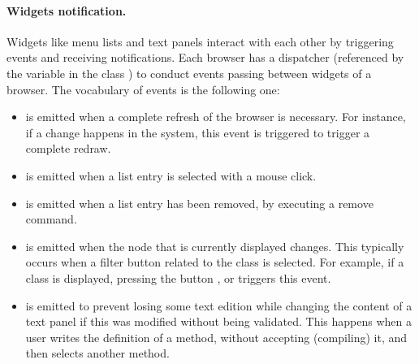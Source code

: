 \documentclass[a4paper,10pt,twoside]{book}
\begin{document}



\paragraph{Widgets notification.} Widgets like menu lists and text panels interact with each other by triggering events and receiving notifications. Each browser has a dispatcher (referenced by the variable  in the class ) to conduct events passing between widgets of a browser. The vocabulary of events is the following one:
\begin{itemize}
\item {} is emitted when a complete refresh of the browser is necessary. For instance, if a change happens in the system, this event is triggered to trigger a complete redraw.

\item {} is emitted when a list entry is selected with a mouse click. 

\item {} is emitted when a list entry has been removed, \eg by executing a remove command. 

\item {} is emitted when the node that is currently displayed changes. This typically occurs when a filter button related to the class is selected. For example, if a class is displayed, pressing the button ,  or  triggers this event.

\item {} is emitted to prevent losing some text edition while changing the content of a text panel if this was modified without being validated. This happens when a user writes the definition of a method, without accepting (\ie compiling) it, and then selects another method.
\end{itemize}
\end{document}
